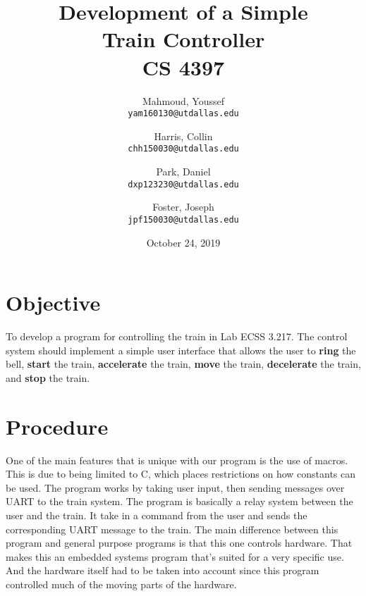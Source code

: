 \documentclass{article}
\author{
	Mahmoud, Youssef\\
	\texttt{yam160130@utdallas.edu}
	\and
	Harris, Collin\\
	\texttt{chh150030@utdallas.edu}
	\and
	Park, Daniel\\
	\texttt{dxp123230@utdallas.edu}
	\and
	Foster, Joseph\\
	\texttt{jpf150030@utdallas.edu}
}
\date{October 24, 2019}
\title{
  \textbf{
    Development of a Simple \\ Train Controller \\ CS 4397
  }
}
\begin{document}
  \maketitle

  \section{Objective}
    To develop a program for controlling the train in Lab ECSS 3.217. The control system
		should implement a simple user interface that allows the user to \textbf{ring} the
		bell, \textbf{start} the train, \textbf{accelerate} the train, \textbf{move} the
		train, \textbf{decelerate} the train, and \textbf{stop} the train.

  \section{Procedure}
	  One of the main features that is unique with our program is the use of macros. This is due to being limited to
	  C, which places restrictions on how constants can be used. The program works by taking user input, then sending messages
	  over UART to the train system. The program is basically a relay system between the user and the train. It take in a command 
	  from the user and sends the corresponding UART message to the train. The main difference between this program and general purpose programs is that this one controls hardware. That makes this an embedded systems program that's suited for a very specific use. And the hardware itself had to be taken into account since this program controlled much of the moving parts of the hardware.
\end{document}
